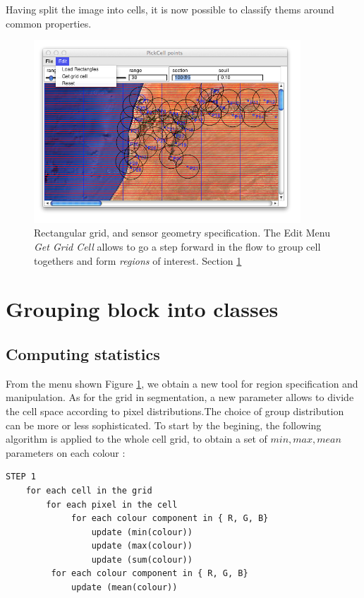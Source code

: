 Having split the image into cells, it is now possible to classify thems around common properties.

\begin{figure}[hbtp]
\begin{center} 
\includegraphics[width=10cm]{SenegalGetGridCell.png}
\caption{Rectangular grid, and sensor geometry specification. The Edit Menu {\sl Get Grid Cell} allows to go a step forward in the flow
to group cell togethers and form {\sl regions} of interest. Section \ref{sec:classification}}
\label{fig:SenegalGetGridCell}
\end{center}
\end{figure}

\section { Grouping block into classes}
\label{sec:classification} 
\subsection { Computing statistics}

From the menu shown Figure  \ref{fig:SenegalGetGridCell}, we obtain a new tool for region
specification and manipulation. As for the grid in segmentation, a new parameter allows to divide
the cell space according to pixel distributions.The choice of group distribution  can be more or less sophisticated.
To start by the begining, the following algorithm is applied to the whole cell grid, to obtain a set of $min, max, mean$ parameters
on each colour :

\begin{lstlisting}  
STEP 1
	for each cell in the grid
		for each pixel in the cell 
			 for each colour component in { R, G, B}
				 update (min(colour))
				 update (max(colour))
				 update (sum(colour))
		 for each colour component in { R, G, B}
			 update (mean(colour))
\end{lstlisting}

